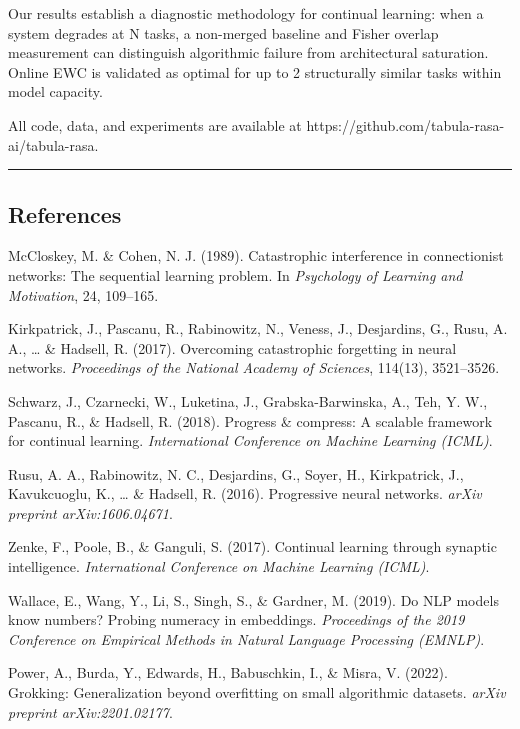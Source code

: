\documentclass[
]{article}
\begin{document}
Our results establish a diagnostic methodology for continual learning:
when a system degrades at N tasks, a non-merged baseline and Fisher
overlap measurement can distinguish algorithmic failure from
architectural saturation. Online EWC is validated as optimal for up to 2
structurally similar tasks within model capacity.

All code, data, and experiments are available at
https://github.com/tabula-rasa-ai/tabula-rasa.

\begin{center}\rule{0.5\linewidth}{0.5pt}\end{center}

\subsection{References}\label{references}

McCloskey, M. \& Cohen, N. J. (1989). Catastrophic interference in
connectionist networks: The sequential learning problem. In
\emph{Psychology of Learning and Motivation}, 24, 109--165.

Kirkpatrick, J., Pascanu, R., Rabinowitz, N., Veness, J., Desjardins,
G., Rusu, A. A., \ldots{} \& Hadsell, R. (2017). Overcoming catastrophic
forgetting in neural networks. \emph{Proceedings of the National Academy
of Sciences}, 114(13), 3521--3526.

Schwarz, J., Czarnecki, W., Luketina, J., Grabska-Barwinska, A., Teh, Y.
W., Pascanu, R., \& Hadsell, R. (2018). Progress \& compress: A scalable
framework for continual learning. \emph{International Conference on
Machine Learning (ICML)}.

Rusu, A. A., Rabinowitz, N. C., Desjardins, G., Soyer, H., Kirkpatrick,
J., Kavukcuoglu, K., \ldots{} \& Hadsell, R. (2016). Progressive neural
networks. \emph{arXiv preprint arXiv:1606.04671}.

Zenke, F., Poole, B., \& Ganguli, S. (2017). Continual learning through
synaptic intelligence. \emph{International Conference on Machine
Learning (ICML)}.

Wallace, E., Wang, Y., Li, S., Singh, S., \& Gardner, M. (2019). Do NLP
models know numbers? Probing numeracy in embeddings. \emph{Proceedings
of the 2019 Conference on Empirical Methods in Natural Language
Processing (EMNLP)}.

Power, A., Burda, Y., Edwards, H., Babuschkin, I., \& Misra, V. (2022).
Grokking: Generalization beyond overfitting on small algorithmic
datasets. \emph{arXiv preprint arXiv:2201.02177}.
\end{document}

